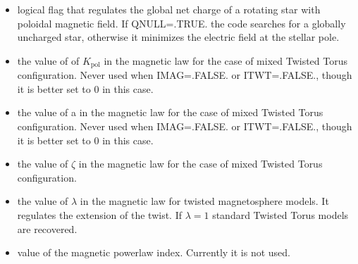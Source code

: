 \documentclass[letterpaper,10pt,english]{sphinxmanual}
\begin{document}
\begin{itemize}
\item {} 
\sphinxAtStartPar
{} \sphinxhyphen{} logical flag that regulates the global net charge of a rotating star with poloidal magnetic field.
If QNULL=.TRUE. the code searches for a globally uncharged star, otherwise it minimizes the electric
field at the stellar pole.


\item {} 
\sphinxAtStartPar
{} \sphinxhyphen{} the value of of \(K_\mathrm{pol}\) in the magnetic law for the case of mixed Twisted Torus configuration.
Never used when IMAG=.FALSE. or ITWT=.FALSE., though it is better set to 0 in this case.


\item {} 
\sphinxAtStartPar
{} \sphinxhyphen{} the value of a in the magnetic law for the case of mixed Twisted Torus configuration. Never
used when IMAG=.FALSE. or ITWT=.FALSE., though it is better set to 0 in this case.


\item {} 
\sphinxAtStartPar
{} \sphinxhyphen{} the value of \(\zeta\) in the magnetic law for the case of mixed Twisted Torus configuration.


\item {} 
\sphinxAtStartPar
{} \sphinxhyphen{} the value of \(\lambda\) in the magnetic law for twisted magnetosphere models. It regulates the extension
of the twist. If \(\lambda = 1\) standard Twisted Torus models are recovered.


\item {} 
\sphinxAtStartPar
{} \sphinxhyphen{} value of the magnetic powerlaw index. Currently it is not used.

\end{itemize}
\end{document}
